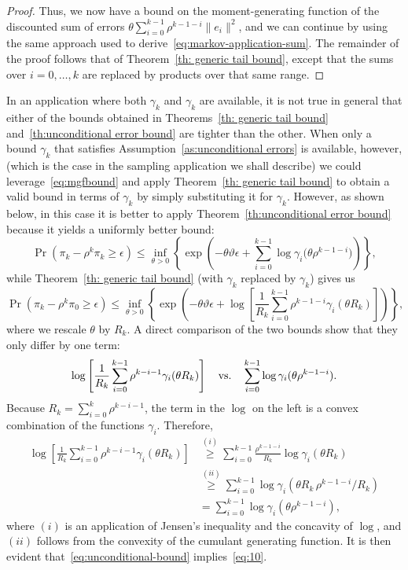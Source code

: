 \begin{proof}
Thus, we now have a bound on the moment-generating function of the
discounted sum of errors
$\theta\sum_{i=0}^{k-1}\rho^{k-1-i}\|e_i\|^2$, and we can continue by
using the same approach used to
derive~\eqref{eq:markov-application-sum}. The remainder of the proof
follows that of Theorem~\ref{th: generic tail bound}, except that the
sums over $i=0,\ldots,k$ are replaced by products over that same
range.
\end{proof}

In an application where both $\gamma_k$ and $\gamma_k$ are available, it
is not true in general that either of the bounds obtained in
Theorems~\ref{th: generic tail bound} and~\ref{th:unconditional error
  bound} are tighter than the other. When only a bound $\gamma_k$ that
satisfies Assumption~\ref{as:unconditional errors} is available,
however, (which is the case in the sampling application we shall describe)
we could leverage~\eqref{eq:mgfbound} and apply
Theorem~\ref{th: generic tail bound} to obtain a valid bound in terms
of $\gamma_k$ by simply substituting it for $\gamma_k$. However, as shown
below, in this case it is better to apply
Theorem~\ref{th:unconditional error bound} because it yields a
uniformly better bound:
\begin{equation}\label{eq:unconditional-bound}
  \Pr\left(\pi_k-\rho^k\pi_k\geq\epsilon\right)
  \leq
  \inf_{\theta>0}
  \left\{
    \exp
    \left(
      -\theta \vartheta
      \epsilon+\sum_{i=0}^{k-1}\log\gamma_{i}\big(\theta\rho^{k-1-i}\big)
    \right)
  \right\},
\end{equation}
while Theorem~\ref{th: generic tail bound} (with $\gamma_k$ replaced by
$\gamma_k$) gives us
\begin{equation} \label{eq:10}
  \Pr\left(\pi_k-\rho^k\pi_{0}\geq\epsilon\right)
  \leq
  \inf_{\theta>0}
  \left\{
    \exp\left(-\theta \vartheta\epsilon
      +\log\left[
        \frac{1}{R_k}\sum_{i=0}^{k-1}\rho^{k-1-i}\gamma_{i}(\theta R_k)
      \right]
    \right)
  \right\},
\end{equation}
where we rescale $\theta$ by $R_k$.  A direct comparison of the two
bounds show that they only differ by one term:
\[
  \log\left[
    \frac{1}{R_{k}}\sum_{i=0}^{k-1}\rho^{k-i-1}\gamma_{i}(\theta R_k)
  \right]\quad 
  \text{\normalfont vs.}\quad 
  \sum_{i=0}^{k-1}\log\gamma_{i}(\theta\rho^{k-1-i}).
\]
Because $R_k=\sum_{i=0}^{k}\rho^{k-i-1}$, the term in the
$\log$ on the left is a convex combination of the functions
$\gamma_{i}$. Therefore,
\begin{align*}
  \log\left[
    \frac{1}{R_{k}}\sum_{i=0}^{k-1}\rho^{k-i-1}\gamma_{i}(\theta R_k)
  \right]
    & \overset{(i)}{\ge}
  \sum_{i=0}^{k-1}\frac{\rho^{k-1-i}}{R_k}\log\gamma_{i}(\theta R_k)
  \\& \overset{(ii)}{\ge}
  \sum_{i=0}^{k-1}\log\gamma_{i}(\theta R_k\,\rho^{k-1-i}/R_k)
  \\& = 
  \sum_{i=0}^{k-1}\log\gamma_{i}(\theta\rho^{k-1-i}),
\end{align*}
where $(i)$ is an application of Jensen's inequality and the concavity
of $\log$, and $(ii)$ follows from the convexity of the cumulant
generating function. It is then evident that~\eqref{eq:unconditional-bound}
implies~\eqref{eq:10}.

